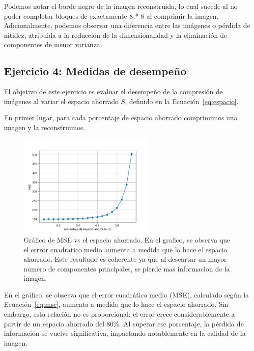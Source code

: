 \documentclass[a4paper,12pt]{article}
\begin{document}
Podemos notar el borde negro de la imagen reconstruida, lo cual sucede al no poder completar bloques de exactamente 8 * 8 al comprimir la imagen.
Adicionalmente, podemos observar una diferencia entre las imágenes o pérdida de nitidez, atribuida a la reducción de la dimensionalidad y la eliminación de componentes de menor varianza.

\subsection*{Ejercicio 4: Medidas de desempeño}

El objetivo de este ejercicio es evaluar el desempeño de la compresión de imágenes al variar el espacio ahorrado $S$, definido en la Ecuación~\ref{eq:espacio}.

En primer lugar, para cada porcentaje de espacio ahorrado comprimimos una imagen y la reconstruimos.

\begin{figure}[H]
    \centering
    \includegraphics[width=0.6\textwidth]{Ejercicio 4a.png}
    \caption{Gráfico de MSE vs el espacio ahorrado. En el grafico, se observa que el errror cuadratico medio aumenta a 
    medida que lo hace el espacio ahorrado. Este resultado es coherente ya que al descartar un mayor numero de componentes principales, 
    se pierde mas informacion de la imagen.}
    \label{fig:ej4}
\end{figure}

En el gráfico, se observa que el error cuadrático medio (MSE), calculado según la Ecuación~\ref{eq:mse}, aumenta a medida que lo hace el espacio ahorrado.
Sin embargo, esta relación no es proporcional: el error crece considerablemente a partir de un espacio ahorrado del 80\%. Al superar ese porcentaje, la pérdida de información se vuelve significativa, impactando notablemente en la calidad de la imagen. 
\end{document}
